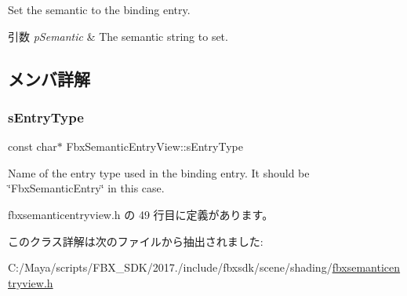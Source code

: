 Set the semantic to the binding entry. 
\begin{DoxyParams}{引数}
{\em p\+Semantic} & The semantic string to set. \\
\hline
\end{DoxyParams}


\subsection{メンバ詳解}
\mbox{\label{class_fbx_semantic_entry_view_a971315cc135c67cb4ca164a69fe6f6b2}} 
\subsubsection{\texorpdfstring{s\+Entry\+Type}{sEntryType}}
{\footnotesize\ttfamily const char$\ast$ Fbx\+Semantic\+Entry\+View\+::s\+Entry\+Type\hspace{0.3cm}{\ttfamily [static]}}

Name of the entry type used in the binding entry. It should be \char`\"{}\+Fbx\+Semantic\+Entry\char`\"{} in this case. 

 fbxsemanticentryview.\+h の 49 行目に定義があります。



このクラス詳解は次のファイルから抽出されました\+:\begin{DoxyCompactItemize}
\item 
C\+:/\+Maya/scripts/\+F\+B\+X\+\_\+\+S\+D\+K/2017./include/fbxsdk/scene/shading/\hyperlink{fbxsemanticentryview_8h}{fbxsemanticentryview.\+h}\end{DoxyCompactItemize}
